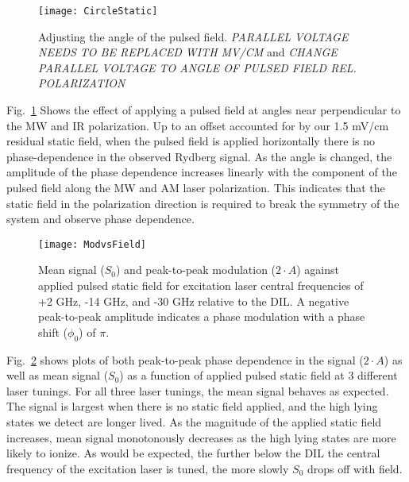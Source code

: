 \documentclass[aps,pra,preprint,groupedaddress]{revtex4-1}
\begin{document}

\begin{figure}
	\texttt{[image: CircleStatic]}
	\caption{Adjusting the angle of the pulsed field. \emph{PARALLEL VOLTAGE NEEDS TO BE REPLACED WITH MV/CM} and \emph{CHANGE PARALLEL VOLTAGE TO ANGLE OF PULSED FIELD REL. POLARIZATION}}
	\label{fig:CircleStatic}
\end{figure}

Fig.~\ref{fig:CircleStatic} Shows the effect of applying a pulsed field at angles near perpendicular to the MW and IR polarization. Up to an offset accounted for by our 1.5 mV/cm residual static field, when the pulsed field is applied horizontally there is no phase-dependence in the observed Rydberg signal. As the angle is changed, the amplitude of the phase dependence increases linearly with the component of the pulsed field along the MW and AM laser polarization. This indicates that the static field in the polarization direction is required to break the symmetry of the system and observe phase dependence.

\begin{figure}
	\texttt{[image: ModvsField]}
	\caption{Mean signal ($S_0$) and peak-to-peak modulation ($2\cdot A$) against applied pulsed static field for excitation laser central frequencies of +2 GHz, -14 GHz, and -30 GHz relative to the DIL. A negative peak-to-peak amplitude indicates a phase modulation with a phase shift ($\phi_0$) of $\pi$.}
	\label{fig:ModvsField}
\end{figure}

Fig.~\ref{fig:ModvsField} shows plots of both peak-to-peak phase dependence in the signal ($2\cdot A$) as well as mean signal ($S_0$) as a function of applied pulsed static field at 3 different laser tunings. For all three laser tunings, the mean signal behaves as expected. The signal is largest when there is no static field applied, and the high lying states we detect are longer lived. As the magnitude of the applied static field increases, mean signal monotonously decreases as the high lying states are more likely to ionize. As would be expected, the further below the DIL the central frequency of the excitation laser is tuned, the more slowly $S_0$ drops off with field.
\end{document}
